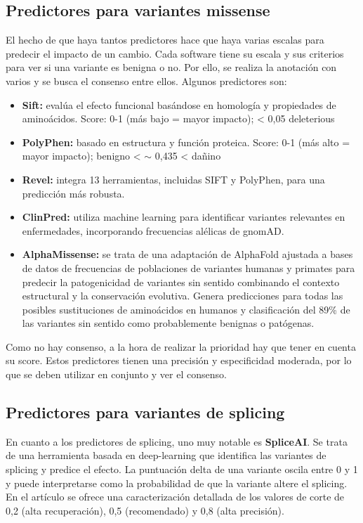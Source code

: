 \subsection{Predictores para variantes missense}
El hecho de que haya tantos predictores hace que haya varias escalas para predecir el impacto de un cambio. Cada software tiene su escala y sus criterios para ver si una variante es benigna o no. Por ello, se realiza la anotación con varios y se busca el consenso entre ellos. Algunos predictores son:
\begin{itemize}
\item \textbf{Sift:} evalúa el efecto funcional basándose en homología y propiedades de aminoácidos. Score: 0-1 (más bajo = mayor impacto); < 0,05 deleterious
\item \textbf{PolyPhen:} basado en estructura y función proteica. Score: 0-1 (más alto = mayor impacto); benigno < $\sim$ 0,435 < dañino
\item \textbf{Revel:}  integra 13 herramientas, incluidas SIFT y PolyPhen, para una predicción más robusta.
\item \textbf{ClinPred:} utiliza machine learning para identificar variantes relevantes en enfermedades, incorporando frecuencias alélicas de gnomAD.
\item \textbf{AlphaMissense:} se trata de una adaptación de AlphaFold ajustada a bases de datos de frecuencias de poblaciones de variantes humanas y primates para predecir la patogenicidad de variantes sin sentido combinando el contexto estructural y la conservación evolutiva. Genera predicciones para todas las posibles sustituciones de aminoácidos en humanos y clasificación del 89\% de las variantes sin sentido como probablemente benignas o patógenas.
\end{itemize}

Como no hay consenso, a la hora de realizar la prioridad hay que tener en cuenta su score. Estos predictores tienen una precisión y especificidad moderada, por lo que se deben utilizar en conjunto y ver el consenso.

\subsection{Predictores para variantes de splicing}
En cuanto a los predictores de splicing, uno muy notable es \textbf{SpliceAI}. Se trata de una herramienta basada en deep-learning que identifica las variantes de splicing y predice el efecto. La puntuación delta de una variante oscila entre 0 y 1 y puede interpretarse como la probabilidad de que la variante altere el splicing. En el artículo se ofrece una caracterización detallada de los valores de corte de 0,2 (alta recuperación), 0,5 (recomendado) y 0,8 (alta precisión).

